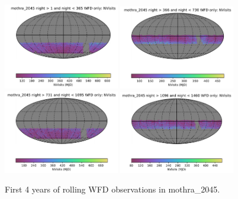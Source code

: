 \documentclass[DM,lsstdraft,authoryear,toc]{lsstdoc}
\begin{document}
\begin{figure}[ht]
\centering
\includegraphics[width=0.45\textwidth]{figures/mothra_2045_NVisits_night_gt_1_and_night_lt_365_WFD_only_HEAL_SkyMap.pdf}
\includegraphics[width=0.45\textwidth]{figures/mothra_2045_NVisits_night_gt_366_and_night_lt_730_WFD_only_HEAL_SkyMap.pdf}\\
\includegraphics[width=0.45\textwidth]{figures/mothra_2045_NVisits_night_gt_731_and_night_lt_1095_WFD_only_HEAL_SkyMap.pdf}
\includegraphics[width=0.45\textwidth]{figures/mothra_2045_NVisits_night_gt_1096_and_night_lt_1460_WFD_only_HEAL_SkyMap.pdf}
\caption{First 4 years of rolling WFD observations in  mothra\_2045.}
\label{fig:rolling_nvis-2045}
\end{figure}
\end{document}
